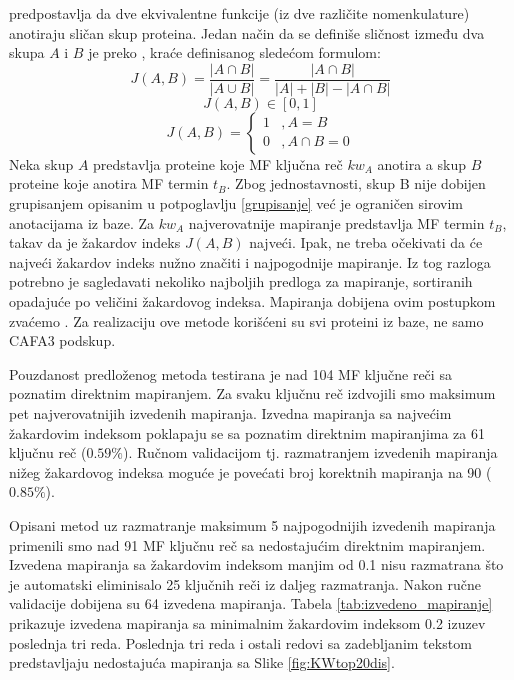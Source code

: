  predpostavlja da dve ekvivalentne funkcije (iz dve
različite nomenkulature) anotiraju sličan skup proteina.  Jedan način da se
definiše sličnost između dva skupa $A$ i $B$ je preko 
, kraće   definisanog sledećom formulom:
$$J(A,B) = \dfrac{|A \cap B|}{|A \cup B|} =  \dfrac{|A \cap B|}{|A|+|B|-|A \cap B|}$$
$$  J(A,B) \in [0, 1] $$
\[   
  J(A,B) = 
    \begin{cases}
      1 &, A=B  \\
      0 &, A\cap B=0
    \end{cases}
\]
Neka skup $A$ predstavlja proteine koje MF ključna reč $kw_A$
anotira a skup $B$ proteine koje anotira MF termin $t_B$.
Zbog jednostavnosti, skup B nije dobijen grupisanjem opisanim u potpoglavlju
\ref{grupisanje} već je ograničen sirovim anotacijama iz \swissprot baze.
Za $kw_A$ najverovatnije mapiranje predstavlja MF termin $t_B$, takav da je žakardov
indeks $J(A,B)$ najveći. Ipak, ne treba očekivati da će najveći žakardov indeks
nužno značiti i najpogodnije mapiranje. Iz tog razloga potrebno je  sagledavati
nekoliko najboljih predloga za mapiranje, sortiranih opadajuće po veličini
žakardovog indeksa. Mapiranja dobijena ovim postupkom zvaćemo .  Za realizaciju ove metode korišćeni su svi proteini iz \swissprot
baze, ne samo CAFA3 podskup.

Pouzdanost predloženog metoda testirana je nad 104 MF ključne reči sa poznatim
direktnim mapiranjem.  Za svaku ključnu reč izdvojili smo maksimum pet
najverovatnijih izvedenih mapiranja. Izvedna mapiranja sa najvećim žakardovim
indeksom poklapaju se sa poznatim direktnim mapiranjima za 61 ključnu reč
($0.59\%$). Ručnom validacijom tj. razmatranjem izvedenih mapiranja nižeg
žakardovog indeksa moguće je povećati broj korektnih mapiranja na 90
($0.85\%$).

Opisani metod uz razmatranje maksimum 5 najpogodnijih izvedenih mapiranja
primenili smo nad 91 MF ključnu reč sa nedostajućim direktnim mapiranjem.
Izvedena mapiranja sa žakardovim indeksom manjim od 0.1 nisu razmatrana što je
automatski eliminisalo 25 ključnih reči iz daljeg razmatranja. Nakon ručne
validacije dobijena su 64 izvedena mapiranja.  Tabela
\ref{tab:izvedeno_mapiranje} prikazuje izvedena mapiranja sa minimalnim
žakardovim indeksom 0.2 izuzev poslednja tri reda. Poslednja tri reda i
ostali redovi sa zadebljanim tekstom  predstavljaju nedostajuća
mapiranja sa Slike \ref{fig:KWtop20dis}.


